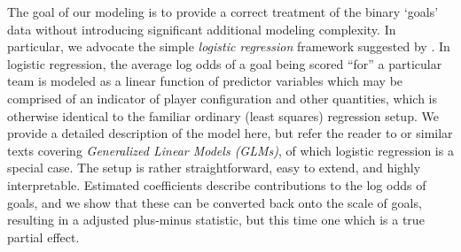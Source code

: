 The goal of our modeling is to provide a correct treatment of the binary
`goals' data without introducing significant additional modeling complexity.
In particular, we advocate the simple \textit{logistic regression} framework
suggested by \cite{gramacy:jensen:taddy:2013}.  In logistic regression, the
average log odds of a goal being scored ``for'' a particular team  is modeled
as a linear function of predictor variables which may be comprised of an
indicator of player configuration and other quantities, which is otherwise
identical to the familiar ordinary (least squares) regression setup.  We
provide a detailed description of the model here, but refer the reader to
\cite{sheather:2009} or similar texts covering {\em Generalized Linear Models
(GLMs)}, of which logistic regression is a special case.
The setup is rather straightforward, easy to
extend, and highly interpretable.  Estimated coefficients describe
contributions to the log odds of goals, and we show that these can be
converted back onto the scale of goals, resulting in a adjusted plus-minus
statistic, but this time one which is a true partial effect.  

